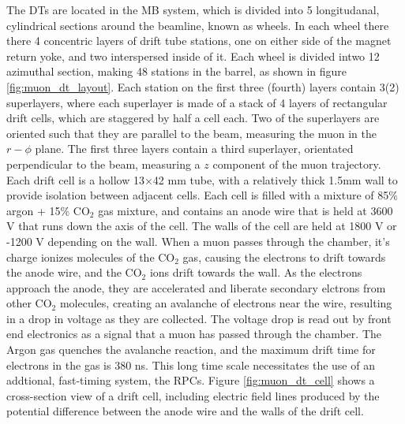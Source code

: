\par The DTs are located in the MB system, which is divided into 5
longitudanal, cylindrical sections around the beamline, known as
wheels.  In each wheel there there 4 concentric layers of drift tube
stations, one on either side of the magnet return yoke, and two
interspersed inside of it.  Each wheel is divided intwo 12 azimuthal
section, making 48 stations in the barrel, as shown in figure
\ref{fig:muon_dt_layout}.  Each station on the first three (fourth)
layers contain 3(2) superlayers, where each superlayer is made of a
stack of 4 layers of rectangular drift cells, which are staggered by
half a cell each.  Two of the superlayers are oriented such that they
are parallel to the beam, measuring the muon in the $r-\phi$ plane.
The first three layers contain a third superlayer, orientated
perpendicular to the beam, measuring a $z$ component of the muon
trajectory.  Each drift cell is a hollow 13$\times$42 mm tube, with a
relatively thick 1.5mm wall to provide isolation between adjacent
cells.  Each cell is filled with a mixture of 85$\%$ argon + 15$\%$
CO$_{2}$ gas mixture, and contains an anode wire that is held at 3600
V that runs down the axis of the cell.  The walls of the cell are held
at 1800 V or -1200 V depending on the wall.  When a muon passes
through the chamber, it's charge ionizes molecules of the CO$_{2}$
gas, causing the electrons to drift towards the anode wire, and the
CO$_{2}$ ions drift towards the wall.  As the electrons approach the
anode, they are accelerated and liberate secondary elctrons from other
CO$_{2}$ molecules, creating an avalanche of electrons near the wire,
resulting in a drop in voltage as they are collected.  The voltage
drop is read out by front end electronics as a signal that a muon has
passed through the chamber.  The Argon gas quenches the avalanche
reaction, and the maximum drift time for electrons in the gas is 380
ns.  This long time scale necessitates the use of an addtional,
fast-timing system, the RPCs.  Figure \ref{fig:muon_dt_cell} shows a
cross-section view of a drift cell, including electric field lines
produced by the potential difference between the anode wire and the
walls of the drift cell.   

